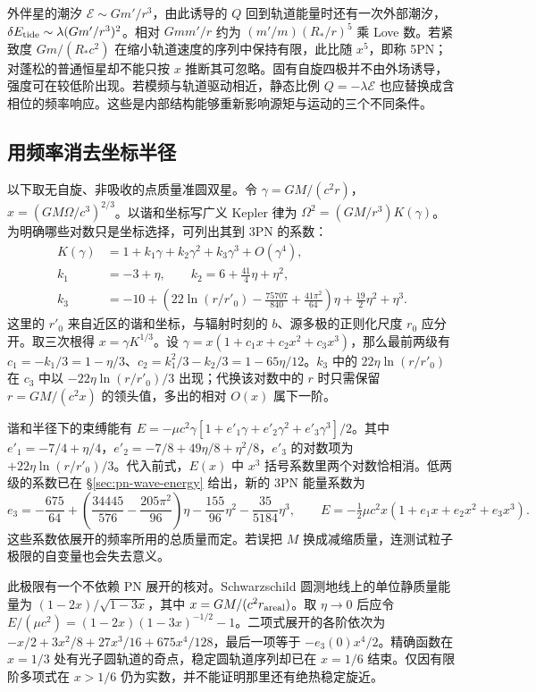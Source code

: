 外伴星的潮汐 $\mathcal E\sim Gm'/r^3$，由此诱导的 $Q$ 回到轨道能量时还有一次外部潮汐，$\delta E_{\rm tide}\sim\lambda(Gm'/r^3)^2$。相对 $Gmm'/r$ 约为 $(m'/m)(R_*/r)^5$ 乘 Love 数。若紧致度 $Gm/(R_*c^2)$ 在缩小轨道速度的序列中保持有限，此比随 $x^5$，即称 5PN；对蓬松的普通恒星却不能只按 $x$ 推断其可忽略。固有自旋四极并不由外场诱导，强度可在较低阶出现。若模频与轨道驱动相近，静态比例 $Q=-\lambda\mathcal E$ 也应替换成含相位的频率响应。这些是内部结构能够重新影响源矩与运动的三个不同条件。

\subsection{用频率消去坐标半径}

以下取无自旋、非吸收的点质量准圆双星。令 $\gamma=GM/(c^2r)$，$x=(GM\Omega/c^3)^{2/3}$。以谐和坐标写广义 Kepler 律为 $\Omega^2=(GM/r^3)K(\gamma)$。为明确哪些对数只是坐标选择，可列出其到 3PN 的系数：
\begin{align*}
 K(\gamma)&=1+k_1\gamma+k_2\gamma^2+k_3\gamma^3+O(\gamma^4),\\
 k_1&=-3+\eta,\qquad k_2=6+\tfrac{41}{4}\eta+\eta^2,\\
 k_3&=-10+\left(22\ln(r/r'_0)-\tfrac{75707}{840}
                  +\tfrac{41\pi^2}{64}\right)\eta
                    +\tfrac{19}{2}\eta^2+\eta^3 .
\end{align*}
这里的 $r'_0$ 来自近区的谐和坐标，与辐射时刻的 $b$、源多极的正则化尺度 $r_0$ 应分开。取三次根得 $x=\gamma K^{1/3}$。设 $\gamma=x(1+c_1x+c_2x^2+c_3x^3)$，那么最前两级有 $c_1=-k_1/3=1-\eta/3$、$c_2=k_1^2/3-k_2/3=1-65\eta/12$。$k_3$ 中的 $22\eta\ln(r/r'_0)$ 在 $c_3$ 中以 $-22\eta\ln(r/r'_0)/3$ 出现；代换该对数中的 $r$ 时只需保留 $r=GM/(c^2x)$ 的领头值，多出的相对 $O(x)$ 属下一阶。

谐和半径下的束缚能有 $E=-\mu c^2\gamma[1+e'_1\gamma+e'_2\gamma^2+e'_3\gamma^3]/2$。其中 $e'_1=-7/4+\eta/4$，$e'_2=-7/8+49\eta/8+\eta^2/8$，$e'_3$ 的对数项为 $+22\eta\ln(r/r'_0)/3$。代入前式，$E(x)$ 中 $x^3$ 括号系数里两个对数恰相消。低两级的系数已在 \S\ref{sec:pn-wave-energy} 给出，新的 3PN 能量系数为
\[
 e_3=-\frac{675}{64}
    +\left(\frac{34445}{576}-\frac{205\pi^2}{96}\right)\eta
    -\frac{155}{96}\eta^2-\frac{35}{5184}\eta^3,
 \qquad E=-\tfrac12\mu c^2x(1+e_1x+e_2x^2+e_3x^3).
\]
这些系数依展开的频率所用的总质量而定。若误把 $M$ 换成减缩质量，连测试粒子极限的自变量也会失去意义。

此极限有一个不依赖 PN 展开的核对。Schwarzschild 圆测地线上的单位静质量能量为 $(1-2x)/\sqrt{1-3x}$，其中 $x=GM/(c^2r_{\rm areal})$。取 $\eta\to0$ 后应令 $E/(\mu c^2)=(1-2x)(1-3x)^{-1/2}-1$。二项式展开的各阶依次为 $-x/2+3x^2/8+27x^3/16+675x^4/128$，最后一项等于 $-e_3(0)x^4/2$。精确函数在 $x=1/3$ 处有光子圆轨道的奇点，稳定圆轨道序列却已在 $x=1/6$ 结束。仅因有限阶多项式在 $x>1/6$ 仍为实数，并不能证明那里还有绝热稳定旋近。

